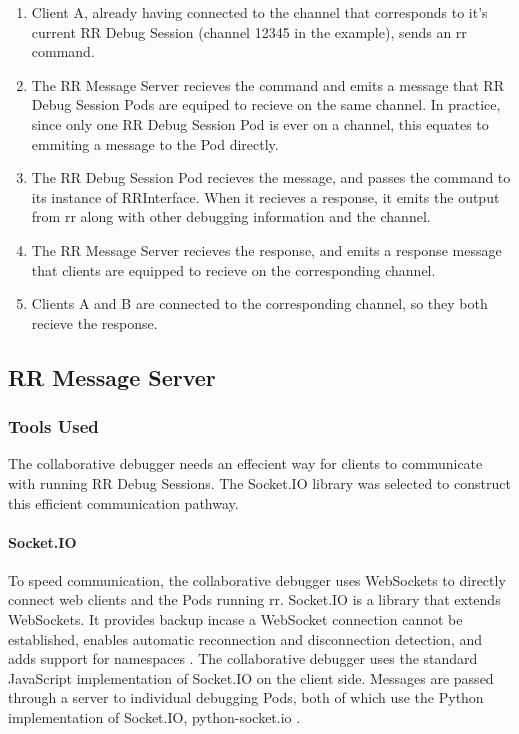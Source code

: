 \documentclass[12pt]{article}
\begin{document}
\begin{enumerate}
\item Client A, already having connected to the channel that
  corresponds to it's current RR Debug Session (channel 12345 in the
  example), sends an rr command.
\item The RR Message Server recieves the command and emits a message
  that RR Debug Session Pods are equiped to recieve on the same
  channel.  In practice, since only one RR Debug Session Pod is ever
  on a channel, this equates to emmiting a message to the Pod
  directly.
\item The RR Debug Session Pod recieves the message, and passes the
  command to its instance of RRInterface.  When it recieves a
  response, it emits the output from rr along with other debugging
  information and the channel.
\item The RR Message Server recieves the response, and emits a
  response message that clients are equipped to recieve on the
  corresponding channel.
\item Clients A and B are connected to the corresponding channel, so
  they both recieve the response.
\end{enumerate}

\subsection{RR Message Server}

\subsubsection{Tools Used}

The collaborative debugger needs an effecient way for clients to
communicate with running RR Debug Sessions. The Socket.IO library was
selected to construct this efficient communication pathway.

\paragraph{Socket.IO}\label{socketio}

To speed communication, the collaborative debugger uses WebSockets to
directly connect web clients and the Pods running rr.  Socket.IO is a
library that extends WebSockets.  It provides backup incase a
WebSocket connection cannot be established, enables automatic
reconnection and disconnection detection, and adds support for
namespaces \cite{socketio}.  The collaborative debugger uses the
standard JavaScript implementation of Socket.IO on the client side.
Messages are passed through a server to individual debugging Pods,
both of which use the Python implementation of Socket.IO,
python-socket.io \cite{python_socketio}.
\end{document}
